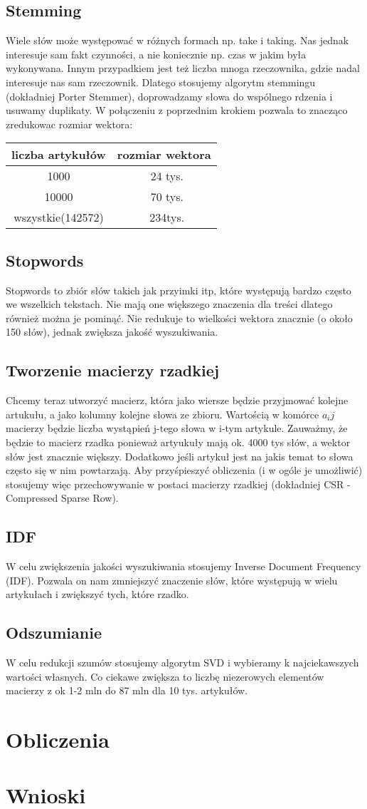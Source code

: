 \documentclass{article}
\begin{document}
\subsection{Stemming}
Wiele słów może występować w różnych formach np. take i taking. Nas jednak interesuje sam fakt czynności, a nie koniecznie np. czas w jakim była wykonywana. Innym przypadkiem jest też liczba mnoga rzeczownika, gdzie nadal interesuje nas sam rzeczownik. Dlatego stosujemy algorytm stemmingu (dokładniej Porter Stemmer), doprowadzamy słowa do wspólnego rdzenia i usuwamy duplikaty. 
W połączeniu z poprzednim krokiem pozwala to znacząco zredukowac rozmiar wektora:
\begin{center}
	\begin{tabular}{c|c}
	liczba artykułów & rozmiar wektora \\ \hline
	1000 &  ~24 tys.\\ \hline
	10000 & ~70 tys.\\ \hline
	wszystkie(142572) & ~234tys.\\
	\end{tabular}
\end{center}
\subsection{Stopwords}
Stopwords to zbiór słów takich jak przyimki itp, które występują bardzo często we wszelkich tekstach. Nie mają one większego znaczenia dla treści dlatego również można je pominąć. Nie redukuje to wielkości wektora znacznie (o około 150 słów), jednak zwiększa jakość wyszukiwania.
\subsection{Tworzenie macierzy rzadkiej}
Chcemy teraz utworzyć macierz, która jako wiersze będzie przyjmować kolejne artukułu, a jako kolumny kolejne słowa ze zbioru. Wartością w komórce $a_ij$ macierzy będzie liczba wystąpień j-tego słowa w i-tym artykule. Zauważmy, że będzie to macierz rzadka ponieważ artyukuły mają ok. 4000 tys słów, a wektor słów jest znacznie większy. Dodatkowo jeśli artykuł jest na jakis temat to słowa często się w nim powtarzają.
Aby przyśpieszyć obliczenia (i w ogóle je umożliwić) stosujemy więc przechowywanie w postaci macierzy rzadkiej (dokładniej CSR - Compressed Sparse Row).
\subsection{IDF}
W celu zwiększenia jakości wyszukiwania stosujemy Inverse Document Frequency (IDF). Pozwala on nam zmniejszyć znaczenie słów, które występują w wielu artykułach i zwiększyć tych, które rzadko.
\subsection{Odszumianie}
W celu redukcji szumów stosujemy algorytm SVD i wybieramy k najciekawszych wartości własnych. Co ciekawe zwiększa to liczbę niezerowych elementów macierzy z ok 1-2 mln do 87 mln dla 10 tys. artykułów.

\section{Obliczenia}

\section{Wnioski}
\end{document}
